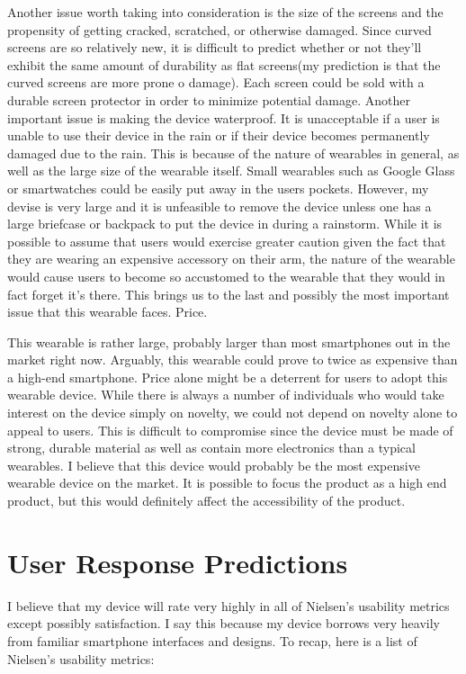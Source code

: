 \documentclass[11pt]{article}
\begin{document}
Another issue worth taking into consideration is the size of the screens and the propensity of getting cracked, scratched, or otherwise damaged. Since curved screens are so relatively new, it is difficult to predict whether or not they'll exhibit the same amount of durability as flat screens(my prediction is that the curved screens are more prone o damage). Each screen could be sold with a durable screen protector in order to minimize potential damage. Another important issue is making the device waterproof. It is unacceptable if a user is unable to use their device in the rain or if their device becomes permanently damaged due to the rain. This is because of the nature of wearables in general, as well as the large size of the wearable itself. Small wearables such as Google Glass or smartwatches could be easily put away in the users pockets. However, my devise is very large and it is unfeasible to remove the device unless one has a large briefcase or backpack to put the device in during a rainstorm. While it is possible to assume that users would exercise greater caution given the fact that they are wearing an expensive accessory on their arm, the nature of the wearable would cause users to become so accustomed to the wearable that they would in fact forget it's there. This brings us to the last and possibly the most important issue that this wearable faces. Price.

This wearable is rather large, probably larger than most smartphones out in the market right now. Arguably, this wearable could prove to twice as expensive than a high-end smartphone. Price alone might be a deterrent for users to adopt this wearable device. While there is always a number of individuals who would take interest on the device simply on novelty, we could not depend on novelty alone to appeal to users. This is difficult to compromise since the device must be made of strong, durable material as well as contain more electronics than a typical wearables. I believe that this device would probably be the most expensive wearable device on the market. It is possible to focus the product as a high end product, but this would definitely affect the accessibility of the product.

\section{User Response Predictions}
I believe that my device will rate very highly in all of Nielsen's usability metrics except possibly satisfaction. I say this because my device borrows very heavily from familiar smartphone interfaces and designs. To recap, here is a list of Nielsen's usability metrics:
\end{document}
